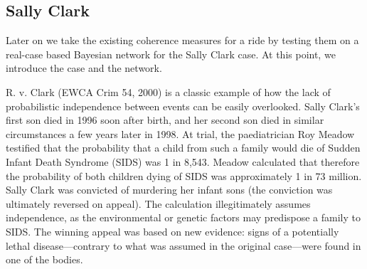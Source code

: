 \documentclass[10pt,]{scrartcl}
\newcommand{\s}[1]{\mbox{\textsf{#1}}}
\begin{document}










\subsection{Sally Clark} \label{subsec:sc}



Later on we take the existing coherence measures for a ride by testing them on a real-case based Bayesian network for the Sally Clark case. At this point, we introduce the case and the network.  

R. v. Clark (EWCA Crim 54, 2000) is a classic  example of how the lack of probabilistic independence between events can be easily overlooked. Sally Clark's first son died in 1996 soon after birth, and her second son died in similar circumstances a few years later in 1998.  At trial, the paediatrician Roy Meadow testified that the probability that a child from such a  family would die of Sudden Infant Death Syndrome (SIDS) was 1 in 8,543.  Meadow calculated that therefore the probability of both children dying of SIDS was approximately  1 in 73 million. Sally Clark was convicted of murdering her  infant sons (the conviction was ultimately reversed on appeal). The calculation illegitimately assumes independence,  as the  environmental or genetic factors may predispose a family to SIDS. The winning appeal was based on new evidence: signs of a potentially lethal disease---contrary to what was assumed in the original case---were found in one of the bodies. 
\end{document}
